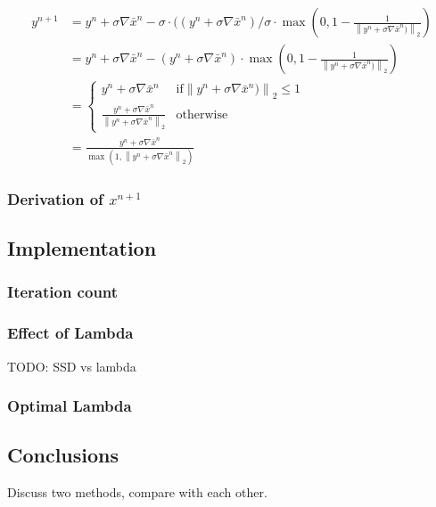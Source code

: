 \documentclass{paper}
\newcommand{\twonorm}[1]{\left\lVert#1\right\rVert_2}
\begin{document}
\begin{align}
	y^{n+1} &= y^n + \sigma \nabla \bar{x}^n - 
			   \sigma \cdot ((y^n + \sigma \nabla \bar{x}^n) / \sigma \cdot
			   \max \left(0, 1 - \frac{1}{\twonorm{y^n + \sigma \nabla \bar{x}^n)}} \right) \\
			&= y^n + \sigma \nabla \bar{x}^n - 
			   (y^n + \sigma \nabla \bar{x}^n) \cdot
			   \max \left(0, 1 - \frac{1}{\twonorm{y^n + \sigma \nabla \bar{x}^n)}} \right) \\
			&= \begin{cases}
   				y^n + \sigma \nabla \bar{x}^n  			
   						& \text{if} \twonorm{y^n + \sigma \nabla \bar{x}^n)} \leq 1 \\
   				\frac{y^n + \sigma \nabla \bar{x}^n}
				    {\twonorm{y^n + \sigma \nabla \bar{x}^n}}      
				    		& \text{otherwise}
  			 \end{cases} \label{eq:cases_F_star} \\
			&= \frac{y^n + \sigma \nabla \bar{x}^n}
				    {\max \left(1, \twonorm{y^n + \sigma \nabla \bar{x}^n}\right)}
\end{align}

\subsubsection*{Derivation of $x^{n+1}$}

\subsection*{Implementation}

\subsubsection*{Iteration count}


\subsubsection*{Effect of Lambda}
TODO: SSD vs lambda

\subsubsection*{Optimal Lambda}

\subsection*{Conclusions}
Discuss two methods, compare with each other.
\end{document}
